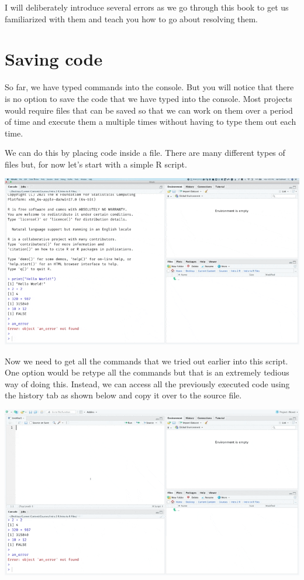 \documentclass[
]{book}
\begin{document}
I will deliberately introduce several errors as we go through this book to get us familiarized with them and teach you how to go about resolving them.

\hypertarget{saving-code}{%
\section{Saving code}\label{saving-code}}

So far, we have typed commands into the console. But you will notice that there is no option to save the code that we have typed into the console. Most projects would require files that can be saved so that we can work on them over a period of time and execute them a multiple times without having to type them out each time.

We can do this by placing code inside a file. There are many different types of files but, for now let's start with a simple R script.

\includegraphics{assets/ch_1-setup/gifs/new_file.gif}

Now we need to get all the commands that we tried out earlier into this script. One option would be retype all the commands but that is an extremely tedious way of doing this. Instead, we can access all the previously executed code using the history tab as shown below and copy it over to the source file.

\includegraphics{assets/ch_1-setup/gifs/history.gif}
\end{document}
